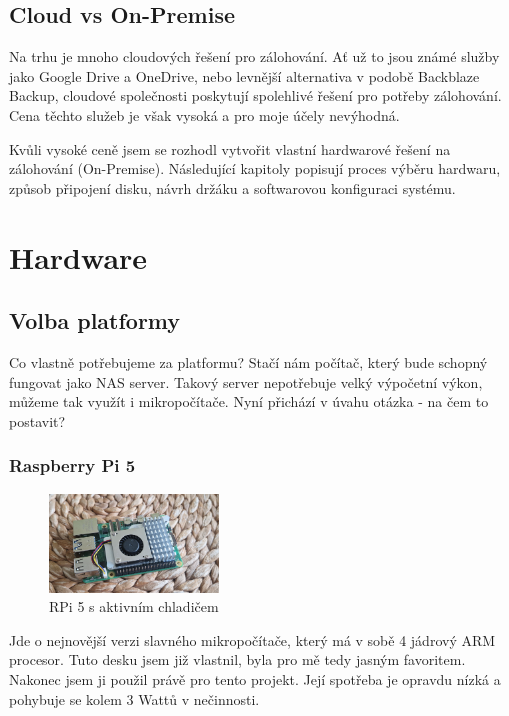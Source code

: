 \documentclass[a4paper,12pt, oneside]{book}
\begin{document}
\section{Cloud vs On-Premise}

Na trhu je mnoho cloudových řešení pro zálohování. 
Ať už to jsou známé služby jako Google Drive a OneDrive, nebo 
levnější alternativa v podobě Backblaze Backup, cloudové společnosti poskytují 
spolehlivé řešení pro potřeby zálohování. Cena těchto služeb je však vysoká a pro moje účely nevýhodná. 

Kvůli vysoké ceně jsem se rozhodl vytvořit vlastní hardwarové řešení na
zálohování (On-Premise).
Následující kapitoly popisují
proces výběru hardwaru, způsob připojení disku, návrh držáku a softwarovou
konfiguraci systému.


\chapter{Hardware}
\section{Volba platformy}

Co vlastně potřebujeme za platformu? Stačí nám počítač, který bude 
schopný fungovat jako NAS server. Takový server nepotřebuje velký
výpočetní výkon, můžeme tak využít i mikropočítače. 
Nyní přichází v úvahu otázka - na čem to postavit? 


\subsection{Raspberry Pi 5}

\begin{figure}
	\centering
	\includegraphics[width=0.4\textwidth]{img/rpi5-active-cooler-c.jpg}
	\caption{RPi 5 s aktivním chladičem}
\end{figure}
Jde o nejnovější verzi slavného mikropočítače, který má v sobě 4 jádrový ARM
procesor. Tuto desku jsem již vlastnil, byla pro mě tedy jasným favoritem.
Nakonec jsem ji použil právě pro tento projekt. Její spotřeba je opravdu nízká
a pohybuje se kolem 3 Wattů v nečinnosti.  \cite{RPi-Power}
\end{document}
